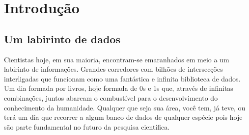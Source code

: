


\chapter{Introdução}
\label{sec:Intro}


\section{Um labirinto de dados}
\label{sec:Intro:LabData}

Cientistas hoje, em sua maioria, encontram-se emaranhados em meio a um labirinto de informações. Grandes corredores com
bilhões de intersecções interligadas que funcionam como uma fantástica e infinita biblioteca de dados. Um dia formada
por livros, hoje formada de 0s e 1s que, através de infinitas combinações, juntos abarcam o combustível para o
desenvolvimento do conhecimento da humanidade. Qualquer que seja sua área, você tem, já teve, ou terá um dia que
recorrer a algum banco de dados de qualquer espécie pois hoje são parte fundamental no futuro da pesquisa científica.

